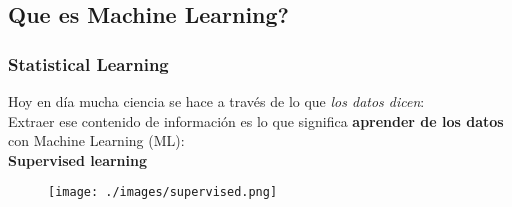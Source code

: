 \documentclass[10pt]{beamer}
\begin{document}
\subsection{Que es Machine Learning?} %
\begin{frame} \frametitle{Statistical Learning}
Hoy en d\'{i}a mucha ciencia se hace a trav\'es de lo que \textit{los datos dicen}:\\
Extraer ese contenido de informaci\'on es lo que significa \textbf{aprender de los datos} con Machine Learning (ML):\\
\centering
\textbf{Supervised learning}
 \begin{figure}
 \texttt{[image: ./images/supervised.png]}
\end{figure}
\end{frame}
\end{document}
